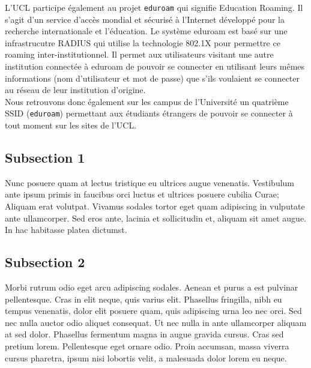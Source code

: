 L'UCL participe également au projet \texttt{eduroam} qui signifie Education Roaming. Il s'agit d'un service d'accès mondial et sécurisé à l'Internet développé pour la recherche internationale et l'éducation. Le système eduroam est basé sur une infrastrucutre RADIUS qui utilise la technologie 802.1X pour permettre ce roaming inter-institutionnel. Il permet aux utilisateurs visitant une autre institution connectée à eduroam de pouvoir se connecter en utilisant leurs mêmes informations (nom d'utilisateur et mot de passe) que s'ils voulaient se connecter au réseau de leur institution d'origine.\\
Nous retrouvons donc également sur les campus de l'Université un quatrième SSID (\texttt{eduroam}) permettant aux étudiants étrangers de pouvoir se connecter à tout moment sur les sites de l'UCL.

\subsection{Subsection 1}

Nunc posuere quam at lectus tristique eu ultrices augue venenatis. Vestibulum ante ipsum primis in faucibus orci luctus et ultrices posuere cubilia Curae; Aliquam erat volutpat. Vivamus sodales tortor eget quam adipiscing in vulputate ante ullamcorper. Sed eros ante, lacinia et sollicitudin et, aliquam sit amet augue. In hac habitasse platea dictumst.


\subsection{Subsection 2}
Morbi rutrum odio eget arcu adipiscing sodales. Aenean et purus a est pulvinar pellentesque. Cras in elit neque, quis varius elit. Phasellus fringilla, nibh eu tempus venenatis, dolor elit posuere quam, quis adipiscing urna leo nec orci. Sed nec nulla auctor odio aliquet consequat. Ut nec nulla in ante ullamcorper aliquam at sed dolor. Phasellus fermentum magna in augue gravida cursus. Cras sed pretium lorem. Pellentesque eget ornare odio. Proin accumsan, massa viverra cursus pharetra, ipsum nisi lobortis velit, a malesuada dolor lorem eu neque.


